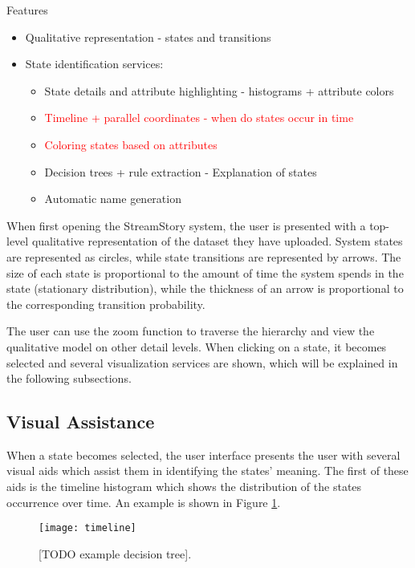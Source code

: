 Features  
\begin{itemize}
	\item Qualitative representation - states and transitions
	\item State identification services:
	\begin{itemize}
		\item State details and attribute highlighting - histograms + attribute colors
		\item \textcolor{red}{Timeline + parallel coordinates \cite{parcoords} - when do states occur in time}
		\item \textcolor{red}{Coloring states based on attributes}
		\item Decision trees + rule extraction - Explanation of states
		\item Automatic name generation
	\end{itemize}
\end{itemize}

When first opening the StreamStory system, the user is presented with a top-level qualitative representation
of the dataset they have uploaded. System states are represented as circles, while state transitions are
represented by arrows. The size of each state is proportional to the amount of time the system spends in
the state (stationary distribution), while the thickness of an arrow is proportional to the corresponding
transition probability.

The user can use the zoom function to traverse the hierarchy and view the qualitative model on other 
detail levels. When clicking on a state, it becomes selected and several visualization services are
shown, which will be explained in the following subsections.

\subsection{Visual Assistance}

When a state becomes selected, the user interface presents the user with several visual aids which
assist them in identifying the states' meaning. The first of these aids is the timeline histogram
which shows the distribution of the states occurrence over time. An example is shown in Figure 
\ref{fig:time-hist}.

\begin{figure}[h!]
	\centering
	\texttt{[image: timeline]}
	\caption{[TODO example decision tree].}
	\label{fig:time-hist}
\end{figure}

